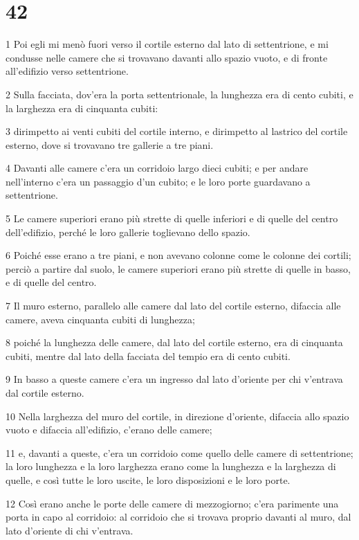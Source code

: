 \chapter{42}

\par 1 Poi egli mi menò fuori verso il cortile esterno dal lato di settentrione, e mi condusse nelle camere che si trovavano davanti allo spazio vuoto, e di fronte all'edifizio verso settentrione.
\par 2 Sulla facciata, dov'era la porta settentrionale, la lunghezza era di cento cubiti, e la larghezza era di cinquanta cubiti:
\par 3 dirimpetto ai venti cubiti del cortile interno, e dirimpetto al lastrico del cortile esterno, dove si trovavano tre gallerie a tre piani.
\par 4 Davanti alle camere c'era un corridoio largo dieci cubiti; e per andare nell'interno c'era un passaggio d'un cubito; e le loro porte guardavano a settentrione.
\par 5 Le camere superiori erano più strette di quelle inferiori e di quelle del centro dell'edifizio, perché le loro gallerie toglievano dello spazio.
\par 6 Poiché esse erano a tre piani, e non avevano colonne come le colonne dei cortili; perciò a partire dal suolo, le camere superiori erano più strette di quelle in basso, e di quelle del centro.
\par 7 Il muro esterno, parallelo alle camere dal lato del cortile esterno, difaccia alle camere, aveva cinquanta cubiti di lunghezza;
\par 8 poiché la lunghezza delle camere, dal lato del cortile esterno, era di cinquanta cubiti, mentre dal lato della facciata del tempio era di cento cubiti.
\par 9 In basso a queste camere c'era un ingresso dal lato d'oriente per chi v'entrava dal cortile esterno.
\par 10 Nella larghezza del muro del cortile, in direzione d'oriente, difaccia allo spazio vuoto e difaccia all'edifizio, c'erano delle camere;
\par 11 e, davanti a queste, c'era un corridoio come quello delle camere di settentrione; la loro lunghezza e la loro larghezza erano come la lunghezza e la larghezza di quelle, e così tutte le loro uscite, le loro disposizioni e le loro porte.
\par 12 Così erano anche le porte delle camere di mezzogiorno; c'era parimente una porta in capo al corridoio: al corridoio che si trovava proprio davanti al muro, dal lato d'oriente di chi v'entrava.

